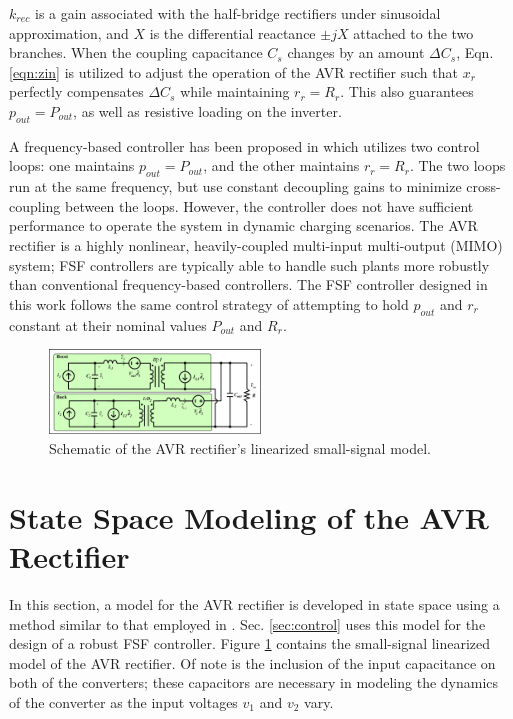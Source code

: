 \documentclass[conference, twocolumn, letterpaper]{IEEEtran}
\begin{document}
\normalsize

$k_{rec}$ is a gain associated with the half-bridge rectifiers under sinusoidal approximation, and $X$ is the differential reactance $\pm jX$ attached to the two branches. When the coupling capacitance $C_s$ changes by an amount $\Delta C_s$, Eqn. \ref{eqn:zin} is utilized to adjust the operation of the AVR rectifier such that $x_r$ perfectly compensates $\Delta C_s$ while maintaining $r_r = R_r$. This also guarantees $p_{out} = P_{out}$, as well as resistive loading on the inverter.

A frequency-based controller has been proposed in \cite{2024_Maji_COMPEL} which utilizes two control loops: one maintains $p_{out} = P_{out}$, and the other maintains $r_r = R_r$. The two loops run at the same frequency, but use constant decoupling gains to minimize cross-coupling between the loops. However, the controller does not have sufficient performance to operate the system in dynamic charging scenarios. The AVR rectifier is a highly nonlinear, heavily-coupled multi-input multi-output (MIMO) system; FSF controllers are typically able to handle such plants more robustly than conventional frequency-based controllers. The FSF controller designed in this work follows the same control strategy of attempting to hold $p_{out}$ and $r_r$ constant at their nominal values $P_{out}$ and $R_r$.

\begin{figure}[!ht]
	\centering
	\includegraphics[width=0.5\textwidth]{figures/avr_ss_model_schematic_eps.eps}
  	\caption{Schematic of the AVR rectifier's linearized small-signal model.}
  	\label{fig:small_signal}
	\vspace{-0.5cm}
\end{figure}

\vspace{0.5cm}

\section{State Space Modeling of the AVR Rectifier}
\label{sec:modeling}

In this section, a model for the AVR rectifier is developed in state space using a method similar to that employed in \cite{2010_Mayo_CONIELECOMP}. Sec. \ref{sec:control} uses this model for the design of a robust FSF controller. Figure \ref{fig:small_signal} contains the small-signal linearized model of the AVR rectifier. Of note is the inclusion of the input capacitance on both of the converters; these capacitors are necessary in modeling the dynamics of the converter as the input voltages $v_1$ and $v_2$ vary.
\end{document}
